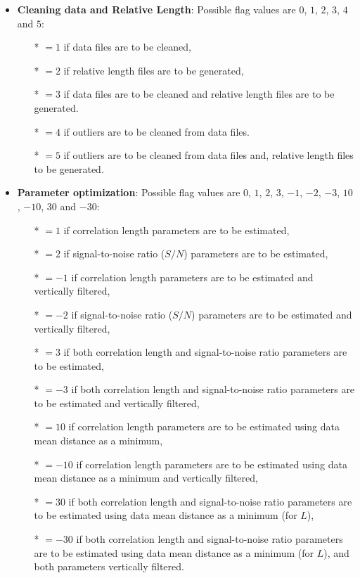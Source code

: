 \begin{itemize}
\item {\bf Cleaning data and Relative Length}: Possible flag values are $0$, $1$, $2$, $3$, $4$ and $5$:
              \begin{itemize}
                \item[*] $=1$ if data files are to be cleaned,
                \item[*] $=2$ if relative length files are to be generated,
                \item[*] $=3$ if data files are to be cleaned and relative length files are to be generated.
                \item[*] $=4$ if outliers are to be cleaned from data files.
                \item[*] $=5$ if outliers are to be cleaned from data files and, relative length files to be generated.
              \end{itemize}


\item {\bf Parameter optimization}: Possible flag values are $0$, $1$, $2$, $3$, $-1$, $-2$, $-3$, $10$, $-10$, $30$ and $-30$:
              \begin{itemize}
                \item[*] $=1$ if correlation length parameters are to be estimated,
                \item[*] $=2$ if signal-to-noise ratio ($S/N$) parameters are to be estimated,
                \item[*] $=-1$ if correlation length parameters are to be estimated and vertically filtered,
                \item[*] $=-2$ if signal-to-noise ratio ($S/N$) parameters are to be estimated and vertically filtered,
                \item[*] $=3$ if both  correlation length and  signal-to-noise ratio parameters are to be estimated,
                \item[*] $=-3$ if both  correlation length and  signal-to-noise ratio parameters are to be estimated and vertically filtered,

                \item[*] $=10$ if correlation length parameters are to be estimated using data mean distance as a minimum,
                \item[*] $=-10$ if correlation length parameters are to be estimated using data mean distance as a minimum and vertically filtered,
                \item[*] $=30$ if both  correlation length and signal-to-noise ratio parameters are to be estimated using data mean distance as a minimum (for $L$),
                \item[*] $=-30$ if both  correlation length and signal-to-noise ratio parameters are to be estimated using data mean distance as a minimum (for $L$), and both parameters vertically filtered.
              \end{itemize}


\end{itemize}
